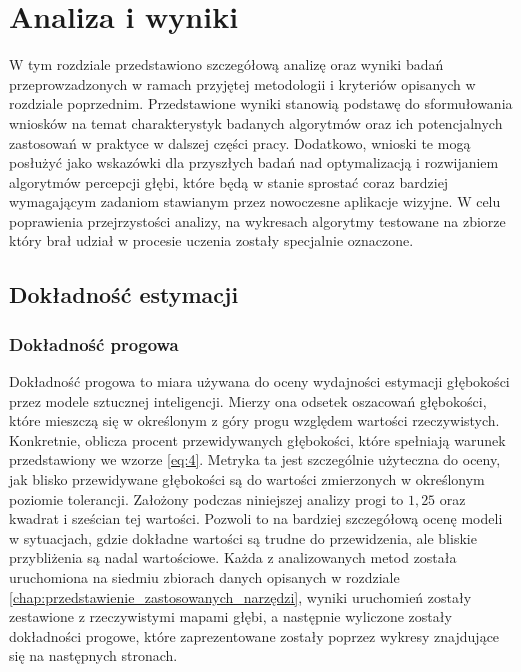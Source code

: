 \chapter{Analiza i wyniki}\label{chap:analiza_i_wyniki}

W tym rozdziale przedstawiono szczegółową analizę oraz wyniki badań przeprowzadzonych w ramach przyjętej metodologii i kryteriów opisanych w rozdziale poprzednim. Przedstawione wyniki stanowią podstawę do sformułowania wniosków na temat charakterystyk badanych algorytmów oraz ich potencjalnych zastosowań w praktyce w dalszej części pracy. Dodatkowo, wnioski te mogą posłużyć jako wskazówki dla przyszłych badań nad optymalizacją i rozwijaniem algorytmów percepcji głębi, które będą w stanie sprostać coraz bardziej wymagającym zadaniom stawianym przez nowoczesne aplikacje wizyjne. W celu poprawienia przejrzystości analizy, na wykresach algorytmy testowane na zbiorze który brał udział w procesie uczenia zostały specjalnie oznaczone.

\section{Dokładność estymacji}
\subsection{Dokładność progowa}
Dokładność progowa to miara używana do oceny wydajności estymacji głębokości przez modele sztucznej inteligencji. Mierzy ona odsetek oszacowań głębokości, które mieszczą się w określonym z góry progu względem wartości rzeczywistych. Konkretnie, oblicza procent przewidywanych głębokości, które spełniają warunek przedstawiony we wzorze \ref{eq:4}. Metryka ta jest szczególnie użyteczna do oceny, jak blisko przewidywane głębokości są do wartości zmierzonych w określonym poziomie tolerancji. Założony podczas niniejszej analizy progi to $1,25$ oraz kwadrat i sześcian tej wartości. Pozwoli to na bardziej szczegółową ocenę modeli w sytuacjach, gdzie dokładne wartości są trudne do przewidzenia, ale bliskie przybliżenia są nadal wartościowe. Każda z analizowanych metod została uruchomiona na siedmiu zbiorach danych opisanych w rozdziale \ref{chap:przedstawienie_zastosowanych_narzędzi}, wyniki uruchomień zostały zestawione z rzeczywistymi mapami głębi, a następnie wyliczone zostały dokładności progowe, które zaprezentowane zostały poprzez wykresy znajdujące się na następnych stronach.


